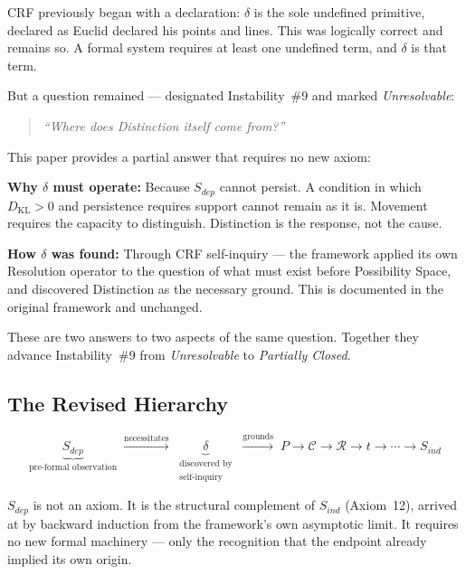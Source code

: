 \documentclass[12pt, a4paper]{article}
\begin{document}
CRF previously began with a declaration: $\delta$ is the sole undefined primitive,
declared as Euclid declared his points and lines. This was logically correct and
remains so. A formal system requires at least one undefined term, and $\delta$
is that term.

But a question remained --- designated Instability~\#9 and marked \textit{Unresolvable}:
\begin{quote}
\textit{``Where does Distinction itself come from?''}
\end{quote}

This paper provides a partial answer that requires no new axiom:

\begin{keybox}[title={Two Answers to Instability \#9}]
\textbf{Why $\delta$ must operate:} Because $S_{dep}$ cannot persist. A condition
in which $D_{\mathrm{KL}} > 0$ and persistence requires support cannot remain as
it is. Movement requires the capacity to distinguish. Distinction is the response,
not the cause.

\medskip
\textbf{How $\delta$ was found:} Through CRF self-inquiry --- the framework applied
its own Resolution operator to the question of what must exist before Possibility Space,
and discovered Distinction as the necessary ground. This is documented in the
original framework and unchanged.

\medskip
These are two answers to two aspects of the same question. Together they advance
Instability~\#9 from \textit{Unresolvable} to \textit{Partially Closed}.
\end{keybox}

\subsection{The Revised Hierarchy}

\begin{keybox}[title={The Complete Pre-Formal to Formal Chain}]
\[
  \underbrace{S_{dep}}_{\text{pre-formal observation}}
  \;\xrightarrow{\text{necessitates}}\;
  \underbrace{\delta}_{\substack{\text{discovered by}\\\text{self-inquiry}}}
  \;\xrightarrow{\text{grounds}}\;
  P \to \mathcal{C} \to \mathcal{R} \to t \to \cdots \to S_{ind}
\]

$S_{dep}$ is not an axiom. It is the structural complement of $S_{ind}$ (Axiom~12),
arrived at by backward induction from the framework's own asymptotic limit.
It requires no new formal machinery --- only the recognition that the endpoint
already implied its own origin.
\end{keybox}
\end{document}
